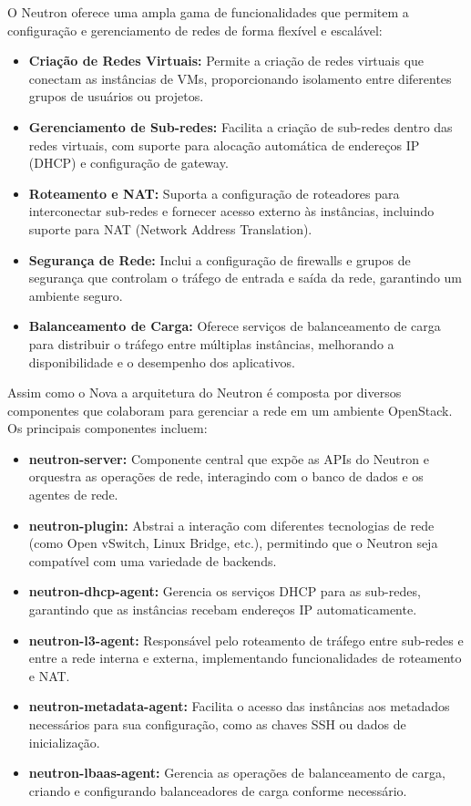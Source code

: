 O Neutron oferece uma ampla gama de funcionalidades que permitem a configuração e gerenciamento de redes de forma flexível e escalável:

\begin{itemize}
    \item \textbf{Criação de Redes Virtuais:} Permite a criação de redes virtuais que conectam as instâncias de VMs, proporcionando isolamento entre diferentes grupos de usuários ou projetos.
    \item \textbf{Gerenciamento de Sub-redes:} Facilita a criação de sub-redes dentro das redes virtuais, com suporte para alocação automática de endereços IP (DHCP) e configuração de gateway.
    \item \textbf{Roteamento e NAT:} Suporta a configuração de roteadores para interconectar sub-redes e fornecer acesso externo às instâncias, incluindo suporte para NAT (Network Address Translation).
    \item \textbf{Segurança de Rede:} Inclui a configuração de firewalls e grupos de segurança que controlam o tráfego de entrada e saída da rede, garantindo um ambiente seguro.
    \item \textbf{Balanceamento de Carga:} Oferece serviços de balanceamento de carga para distribuir o tráfego entre múltiplas instâncias, melhorando a disponibilidade e o desempenho dos aplicativos.
\end{itemize}

Assim como o Nova a arquitetura do Neutron é composta por diversos componentes que colaboram para gerenciar a rede em um ambiente OpenStack. Os principais componentes incluem:

\begin{itemize}
    \item \textbf{neutron-server:} Componente central que expõe as APIs do Neutron e orquestra as operações de rede, interagindo com o banco de dados e os agentes de rede.
    \item \textbf{neutron-plugin:} Abstrai a interação com diferentes tecnologias de rede (como Open vSwitch, Linux Bridge, etc.), permitindo que o Neutron seja compatível com uma variedade de backends.
    \item \textbf{neutron-dhcp-agent:} Gerencia os serviços DHCP para as sub-redes, garantindo que as instâncias recebam endereços IP automaticamente.
    \item \textbf{neutron-l3-agent:} Responsável pelo roteamento de tráfego entre sub-redes e entre a rede interna e externa, implementando funcionalidades de roteamento e NAT.
    \item \textbf{neutron-metadata-agent:} Facilita o acesso das instâncias aos metadados necessários para sua configuração, como as chaves SSH ou dados de inicialização.
    \item \textbf{neutron-lbaas-agent:} Gerencia as operações de balanceamento de carga, criando e configurando balanceadores de carga conforme necessário.
\end{itemize}

